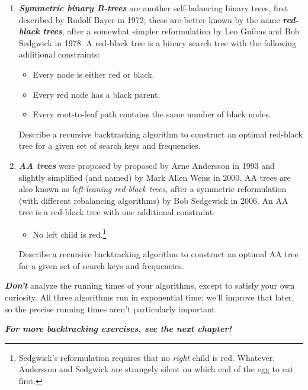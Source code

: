 \begin{exercises}
\begin{enumerate}
Describe a recursive backtracking algorithm to construct an optimal AVL tree for a given set of search keys and frequencies.
\item \textbf{\textit{Symmetric binary B-trees}} are another self-balancing binary trees, first described by Rudolf Bayer in 1972; these are better known by the name \textbf{\textit{red-black trees}}, after a somewhat simpler reformulation by Leo Guibas and Bob Sedgwick in 1978.
A red-black tree is a binary search tree with the following additional constraints:
\begin{itemize}
\item Every node is either red or black.
\item Every red node has a black parent.
\item Every root-to-leaf path contains the same number of black nodes.
\end{itemize}
Describe a recursive backtracking algorithm to construct an optimal red-black tree for a given set of search keys and frequencies.
\item \textbf{\textit{AA trees}} were proposed by proposed by Arne Andersson in 1993 and slightly simplified (and named) by Mark Allen Weiss in 2000.
AA trees are also known as \textit{left-leaning red-black trees}, after a symmetric reformulation (with different rebalancing algorithms) by Bob Sedgewick in 2006.
An AA tree is a red-black tree with one additional constraint:
\begin{itemize}
\item No left child is red.\footnote{Sedgwick’s reformulation requires that no \textit{right} child is red. Whatever. Andersson and Sedgwick are strangely silent on which end of the egg to eat first.}
\end{itemize}
Describe a recursive backtracking algorithm to construct an optimal AA tree for a given set of search keys and frequencies.
\end{enumerate}
\textbf{\textit{Don’t}} analyze the running times of your algorithms, except to satisfy your own curiosity.
All three algorithms run in exponential time; we’ll improve that later, so the precise running times aren’t particularly important.
\end{exercises}

\begin{problembox}
\textbf{\textit{For more backtracking exercises, see the next chapter!}}
\end{problembox}
